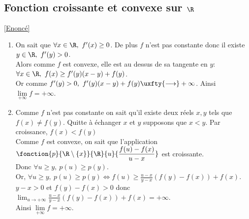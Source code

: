 \documentclass{book}
\begin{document}
	\subsection{Fonction croissante et convexe sur $\R$ }
	\label{Fonction croissante et convexe sur R corrigé}
	\textcolor{blue}{\hyperref[Fonction croissante et convexe sur R]{[Enoncé]}}\\
	\begin{enumerate}[leftmargin=*]
		\item On sait que $\forall x\in \R,\ f'(x)\geq 0$. De plus $f$ n'est pas constante donc il existe $y\in \R,\ f'(y)>0$.\\
		Alors comme $f$ est convexe, elle est au dessus de sa tangente en $y$:\\
		$\forall x\in \R,\ f(x)\geq f'(y)(x-y)+f(y)$.\\
		Or comme $f'(y)>0,\ f'(y)(x-y)+f(y)\uxfty{\longrightarrow}+\infty$. Ainsi $\lim\limits_{+\infty}f=+\infty$.
		\item Comme $f$ n'est pas constante on sait qu'il existe deux réels $x,y$ tels que $f(x)\ne f(y)$. Quitte à échanger $x$ et $y$ supposons que $x<y$. Par croissance, $f(x)<f(y)$\\
		Comme $f$ est convexe, on sait que l'application $\fonction{p}{\R\setminus\{x\}}{\R}{u}{\displaystyle\frac{f(u)-f(x)}{u-x}}$ est croissante.\\
		Donc $\forall u\geq y,\ p(u)\geq p(y)$.\\
		Or, $\forall u\geq y,\ p(u)\geq p(y)\iff f(u)\geq \displaystyle\frac{u-x}{y-x}(f(y)-f(x))+f(x)$.\\
		$y-x>0$ et $f(y)-f(x)>0$ donc $\displaystyle\lim_{u\to +\infty}\frac{u-x}{y-x}(f(y)-f(x))+f(x)=+\infty$.\\
		Ainsi $\lim\limits_{+\infty}f=+\infty$.
	\end{enumerate}
	
\end{document}
